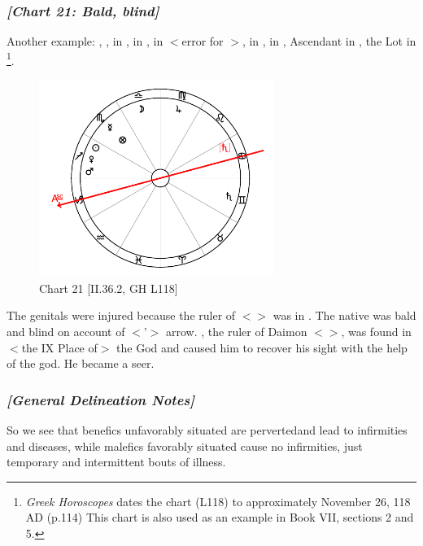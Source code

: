 \subsubsection{\textit{[Chart 21: Bald, blind]}}
Another example: \Sun, \Venus, \Mars\xspace in \Sagittarius, \Moon\xspace in \Libra, \Saturn\xspace in \Cancer $<$error for
\Gemini$>$, \Jupiter\xspace in \Virgo, \Mercury\xspace in \Scorpio, Ascendant in \Capricorn, the Lot in \Scorpio
\footnote{\textit{Greek Horoscopes} dates the chart (L118) to approximately November 26, 118 AD (p.114) This chart is also used as an example in Book VII, sections 2 and 5.}.

\clearpage
\begin{figure}
\centering
\vspace{-20pt}
\includegraphics[width=0.68\textwidth]{charts/2_36_2}
\caption{Chart 21 [II.36.2, GH L118]}
\label{fig:chart21}
\end{figure}

The genitals were injured because the ruler of \Scorpio\xspace $<$\Mars$>$ was in \Sagittarius. The native was bald and blind on account of $<$\Sagittarius’$>$ arrow. \Jupiter, the ruler of Daimon $<$\Pisces$>$, was found in $<$the IX Place of$>$
the God and caused him to recover his sight with the help of the god. He became a seer.

\subsubsection{\textit{[General Delineation Notes]}}
So we see that benefics unfavorably situated are perverted\mnbm and lead to infirmities and diseases, while malefics favorably situated cause no infirmities, just temporary and intermittent bouts of illness. 

